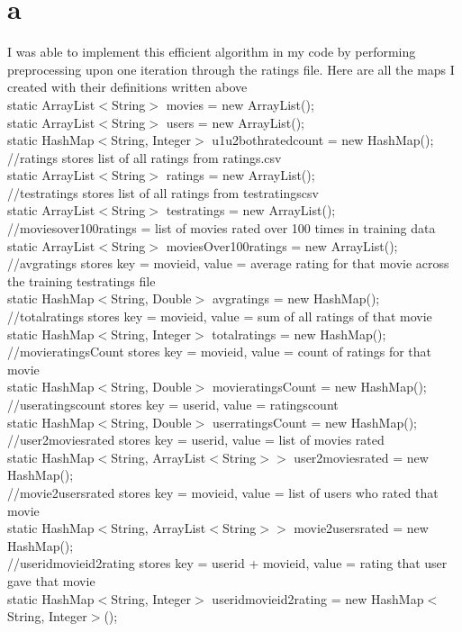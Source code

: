\documentclass[12pt]{article}
\begin{document}
\section*{a} 
I was able to implement this efficient algorithm in my code by performing preprocessing upon one iteration through the ratings file.  Here are all the maps I created with their definitions written above \\
    static ArrayList$<$String$>$ movies = new ArrayList(); \\
    static ArrayList$<$String$>$ users = new ArrayList(); \\
    static HashMap$<$String, Integer$>$ u1u2bothratedcount = new HashMap(); \\
    //ratings stores list of all ratings from ratings.csv \\ 
    static ArrayList$<$String$>$ ratings = new ArrayList(); \\
    //testratings stores list of all ratings from testratingscsv \\
    static ArrayList$<$String$>$ testratings = new ArrayList(); \\
    //moviesover100ratings = list of movies rated over 100 times in training data \\
    static ArrayList$<$String$>$ moviesOver100ratings = new ArrayList(); \\
    //avgratings stores key = movieid, value = average rating for that movie across the training testratings file \\
    static HashMap$<$String, Double$>$ avgratings = new HashMap(); \\
    //totalratings stores key = movieid, value = sum of all ratings of that movie \\ 
    static HashMap$<$String, Integer$>$ totalratings = new HashMap(); \\
    //movieratingsCount stores key = movieid, value = count of ratings for that movie \\
    static HashMap$<$String, Double$>$ movieratingsCount = new HashMap(); \\
    //useratingscount stores key = userid, value = ratingscount \\
    static HashMap$<$String, Double$>$ userratingsCount = new HashMap(); \\
    //user2moviesrated stores key = userid, value = list of movies rated \\
    static HashMap$<$String, ArrayList$<$String$>>$ user2moviesrated = new HashMap(); \\
    //movie2usersrated stores key = movieid, value = list of users who rated that movie \\
    static HashMap$<$String, ArrayList$<$String$>>$ movie2usersrated = new HashMap(); \\
    //useridmovieid2rating stores key = userid + movieid, value = rating that user gave that movie \\
    static HashMap$<$String, Integer$>$ useridmovieid2rating = new HashMap$<$String, Integer$>$(); \\
\end{document}
